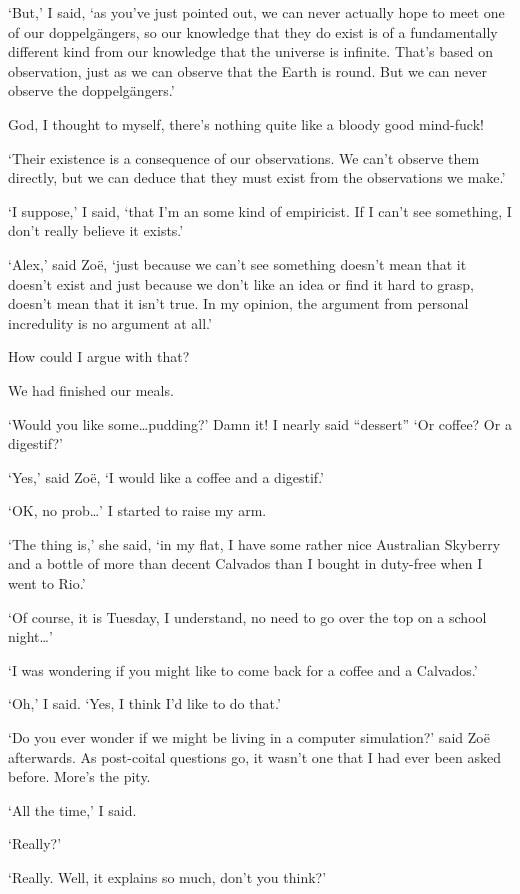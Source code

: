 `But,' I said, `as you've just pointed out, we can never actually
hope to meet one of our doppelgängers, so our knowledge that
they do exist is of a fundamentally different kind from our
knowledge that the universe is infinite. That's based on
observation, just as we can observe that the Earth is round. But we
can never observe the doppelgängers.'

God, I thought to myself, there's nothing quite like a bloody good
mind-fuck!

`Their existence is a consequence of our observations. We can't
observe them directly, but we can deduce that they must exist from
the observations we make.'

`I suppose,' I said, `that I'm an some kind of empiricist. If I
can't see something, I don't really believe it exists.'

`Alex,' said Zoë, `just because we can't see something
doesn't mean that it doesn't exist and just because we don't like an
idea or find it hard to grasp, doesn't mean that it isn't true. In
my opinion, the argument from personal incredulity is no argument at
all.'

How could I argue with that?

We had finished our meals.

`Would you like some\dots pudding?' Damn it! I nearly said
``dessert'' `Or coffee? Or a digestif?'

`Yes,' said Zoë, `I would like a coffee and a
digestif.'

`OK, no prob\dots' I started to raise my arm.

`The thing is,' she said, `in my flat, I have some rather nice
Australian Skyberry and a bottle of more than decent Calvados than I
bought in duty-free when I went to Rio.'

`Of course, it is Tuesday, I understand, no need to go over the top
on a school night\dots'

`I was wondering if you might like to come back for a coffee and a Calvados.'

`Oh,' I said. `Yes, I think I'd like to do that.'

\vskip 1cm

`Do you ever wonder if we might be living in a computer simulation?'
said Zoë afterwards. As post-coital questions go, it wasn't one
that I had ever been asked before. More's the pity.

`All the time,' I said.

`Really?'

`Really. Well, it explains so much, don't you think?'

